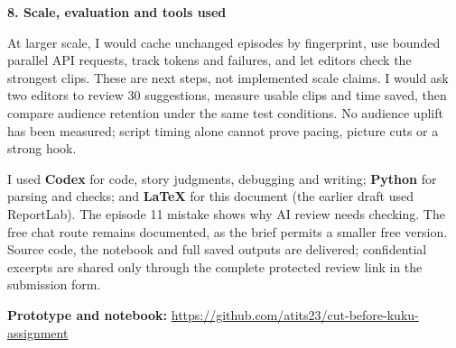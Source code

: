 \documentclass[10pt,a4paper]{article}
\newcommand{\heading}[1]{\vspace{4pt}\textbf{\large #1}\par\vspace{-2pt}}
\begin{document}
\heading{8. Scale, evaluation and tools used}
At larger scale, I would cache unchanged episodes by fingerprint, use bounded parallel API requests, track tokens and failures, and let editors check the strongest clips. These are next steps, not implemented scale claims. I would ask two editors to review 30 suggestions, measure usable clips and time saved, then compare audience retention under the same test conditions. No audience uplift has been measured; script timing alone cannot prove pacing, picture cuts or a strong hook.

I used \textbf{Codex} for code, story judgments, debugging and writing; \textbf{Python} for parsing and checks; and \textbf{LaTeX} for this document (the earlier draft used ReportLab). The episode 11 mistake shows why AI review needs checking. The free chat route remains documented, as the brief permits a smaller free version. Source code, the notebook and full saved outputs are delivered; confidential excerpts are shared only through the complete protected review link in the submission form.

\vspace{2pt}\small
\textbf{Prototype and notebook:} \url{https://github.com/atits23/cut-before-kuku-assignment}
\end{document}

